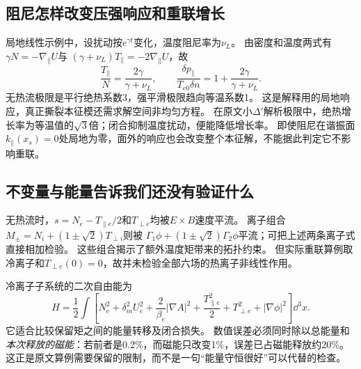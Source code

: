 \subsection{阻尼怎样改变压强响应和重联增长}
局地线性示例中，设扰动按$e^{\gamma t}$变化，温度阻尼率为$\nu_L$。
由密度和温度两式有
$\gamma N=-\nabla_\parallel U$与
$(\gamma+\nu_L)T_\parallel=-2\nabla_\parallel U$，故
\begin{equation}
 \frac{T_\parallel}{N}=\frac{2\gamma}{\gamma+\nu_L},\qquad
 \frac{\delta p_\parallel}{T_{e0}\delta n}
 =1+\frac{2\gamma}{\gamma+\nu_L}.
\end{equation}
无热流极限是平行绝热系数3，强平滑极限趋向等温系数1。
这是解释用的局地响应，真正撕裂本征模还需求解空间非均匀方程。
在原文小$\Delta'$解析极限中，绝热增长率为等温值的$\sqrt3$倍；闭合抑制温度扰动，便能降低增长率。
即使阻尼在谐振面$k_\parallel(x_s)=0$处局地为零，面外的响应也会改变整个本征解，不能据此判定它不影响重联。

\subsection{不变量与能量告诉我们还没有验证什么}
无热流时，$s=N_e-T_{\parallel e}/2$和$T_{\perp e}$均被$E\times B$速度平流。
离子组合$M_\pm=N_i+(1\pm\sqrt2)T_{\perp i}$则被
$\Gamma_1\phi+(1\pm\sqrt2)\Gamma_2\phi$平流；可把上述两条离子式直接相加检验。
这些组合揭示了额外温度矩带来的拓扑约束。
但实际重联算例取冷离子和$T_{\perp e}(0)=0$，故并未检验全部六场的热离子非线性作用。

冷离子子系统的二次自由能为
\begin{equation}
 H=\frac12\int\left[N_e^2+\delta_m^2U_e^2
 +\frac2{\beta_e}|\nabla A|^2+\frac{T_{\parallel e}^2}{2}
 +T_{\perp e}^2+|\nabla\phi|^2\right]\dd^3x.
\end{equation}
它适合比较保留矩之间的能量转移及闭合损失。
数值误差必须同时除以总能量和\emph{本次释放的磁能}：若前者是0.2\%，而磁能只改变1\%，误差已占磁能释放约20\%。
这正是原文算例需要保留的限制，而不是一句“能量守恒很好”可以代替的检查。
